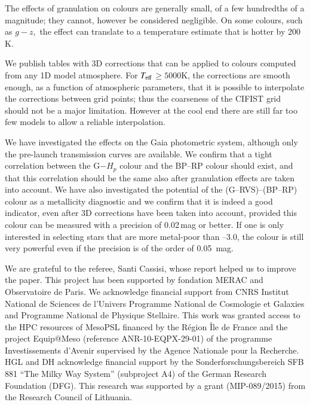 \documentclass[]{aa}
\def\teff{$T\rm_{eff}$}
\begin{document}
The effects of granulation on colours are generally small, 
of a few hundredths of a magnitude; they cannot, however be
considered negligible. On some colours, such as $g-z,$ the 
effect can translate to a temperature estimate that 
is hotter by 200\,K. 

We publish tables with 3D corrections that can be applied to 
colours computed from any 1D model atmosphere. For  \teff $\ge 5000$K,
the corrections are smooth enough, as a function of atmospheric parameters,
that it is possible to interpolate the corrections between
grid points; thus the coarseness of the CIFIST grid should
not be a major limitation. However at the cool end there are still
far too few models to allow a reliable interpolation.

We have investigated the effects on the Gaia photometric system, 
although only the pre-launch transmission curves are available. 
We confirm that a tight correlation between the G$-H_p$ colour
and the BP--RP colour should exist, and that this correlation
should be the same also after granulation effects are taken
into account.
We have also investigated the potential of the
(G--RVS)--(BP--RP) colour as a metallicity diagnostic and we confirm
that it is indeed a good indicator, even after 3D corrections have been
taken into account, provided this colour can be measured with 
a precision of 0.02\,mag or better.  If one is only interested
in selecting stars that are more metal-poor than --3.0, the colour
is still very powerful even if the precision is of the order
of 0.05\, mag.

 
\begin{acknowledgements}
We are grateful to the referee, Santi Cassisi, whose
report helped us to improve the paper.
This project has been supported by fondation MERAC and
Observatoire de Paris. We acknowledge financial support from 
CNRS Institut National de Sciences de l'Univers Programme
National de Cosmologie et Galaxies and Programme National de Physique 
Stellaire.  This work was granted access  to  the  
HPC  resources  of  MesoPSL  financed
by   the   R\'egion   \^{I}le   de   France   and   
the   project Equip@Meso (reference ANR-10-EQPX-29-01) of
the programme Investissements d'Avenir supervised
by  the  Agence  Nationale  pour  la  Recherche. 
HGL and DH acknowledge financial support by the Sonderforschungsbereich SFB\,881
``The Milky Way System'' (subproject A4) of the German Research Foundation
(DFG). This research was supported by a grant (MIP-089/2015) from the Research Council of Lithuania.
\end{acknowledgements}
\end{document}
